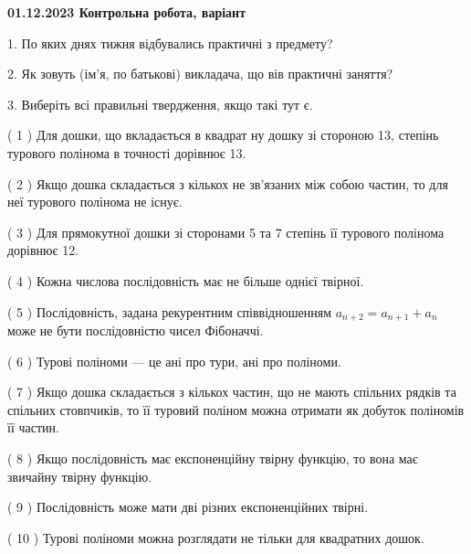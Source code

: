 \documentclass[12pt, ukrainian]{article}
\begin{document}
\vspace{4mm}
\newpage
\begin {large}

\textbf{01.12.2023 Контрольна робота, варіант  }\par


{
1. По яких днях тижня відбувались практичні з предмету?



\vspace{5mm}
2. Як зовуть (ім'я, по батькові) викладача, що вів практичні заняття?



\vspace{5mm}
3. Виберіть всі правильні твердження, якщо такі тут є.\par
\vspace{2mm}
( 1 ) Для дошки, що вкладається в квадрат ну дошку зі стороною 13, степінь турового полінома в точності дорівнює 13.%

( 2 ) Якщо дошка складається з кількох не зв’язаних між собою частин, то для неї турового полінома не існує.%

( 3 ) Для прямокутної дошки зі сторонами 5 та 7 степінь її турового полінома дорівнює 12.%

( 4 ) Кожна числова послідовність має не більше однієї твірної.%

( 5 ) Послідовність, задана рекурентним співвідношенням $a_{n+2}=a_{n+1}+a_{n}$ може не бути послідовністю чисел Фібоначчі.%

( 6 ) Турові поліноми --- це ані про тури, ані про поліноми.%

( 7 ) Якщо дошка складається з кількох частин, що не мають спільних рядків та спільних стовпчиків, то її туровий поліном можна отримати як добуток поліномів її частин.%

( 8 ) Якщо послідовність має експоненційну твірну функцію, то вона має звичайну твірну функцію.%

( 9 ) Послідовність може мати дві різних експоненційних твірні.%

( 10 ) Турові поліноми можна розглядати не тільки для квадратних дошок.%
}
\end {large}
\end{document}
